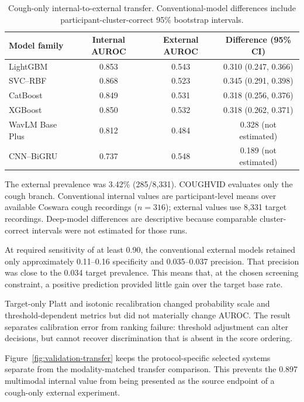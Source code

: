 \begin{table}[!t]
\centering
\caption{Cough-only internal-to-external transfer. Conventional-model
differences include participant-cluster-correct 95\% bootstrap intervals.}
\label{tab:external}
\begin{threeparttable}
\begin{tabular}{lccc}
\toprule
Model family & Internal AUROC & External AUROC & Difference (95\% CI) \\
\midrule
LightGBM & 0.853 & 0.543 & 0.310 (0.247, 0.366) \\
SVC--RBF & 0.868 & 0.523 & 0.345 (0.291, 0.398) \\
CatBoost & 0.849 & 0.531 & 0.318 (0.256, 0.376) \\
XGBoost & 0.850 & 0.532 & 0.318 (0.262, 0.371) \\
WavLM Base Plus & 0.812 & 0.484 & 0.328 (not estimated) \\
CNN--BiGRU & 0.737 & 0.548 & 0.189 (not estimated) \\
\bottomrule
\end{tabular}
\begin{tablenotes}\footnotesize
\item The external prevalence was 3.42\% (285/8,331). COUGHVID evaluates only
the cough branch. Conventional internal values are participant-level means over
available Coswara cough recordings ($n=316$); external values use 8,331 target
recordings. Deep-model differences are descriptive because comparable
cluster-correct intervals were not estimated for those runs.
\end{tablenotes}
\end{threeparttable}
\end{table}

At required sensitivity of at least 0.90, the conventional external models
retained only approximately 0.11--0.16 specificity and 0.035--0.037 precision.
That precision was close to the 0.034 target prevalence. This means that, at
the chosen screening constraint, a positive prediction provided little gain
over the target base rate.

Target-only Platt and isotonic recalibration changed probability scale and
threshold-dependent metrics but did not materially change AUROC. The result
separates calibration error from ranking failure: threshold adjustment can
alter decisions, but cannot recover discrimination that is absent in the score
ordering.

Figure~\ref{fig:validation-transfer} keeps the protocol-specific selected
systems separate from the modality-matched transfer comparison. This prevents
the 0.897 multimodal internal value from being presented as the source endpoint
of a cough-only external experiment.

